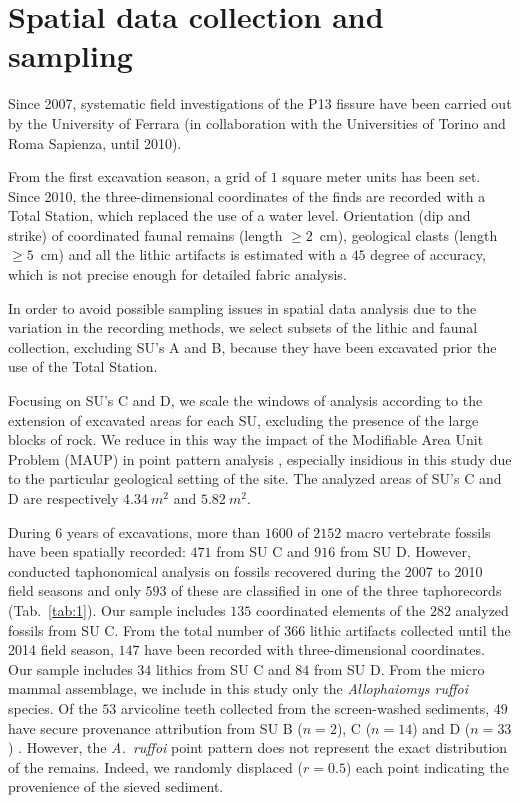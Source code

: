 \documentclass[review,authoryear]{elsarticle} %
\begin{document}
\section{Spatial data collection and sampling}

Since 2007, systematic field investigations of the P13 fissure have been carried out by the University of Ferrara (in collaboration with the Universities of Torino and Roma Sapienza, until 2010).

From the first excavation season, a grid of $1$ square meter units has been set. Since 2010, the three-dimensional coordinates of the finds are recorded with a Total Station, which replaced the use of a water level. Orientation (dip and strike) of coordinated faunal remains (length $\geq2$~cm), geological clasts (length $\geq5$~cm) and all the lithic artifacts is estimated with a $45$ degree of accuracy, which is not precise enough for detailed fabric analysis.

In order to avoid possible sampling issues in spatial data analysis due to the variation in the recording methods, we select subsets of the lithic and faunal collection, excluding SU's A and B, because they have been excavated prior the use of the Total Station.

Focusing on SU's C and D, we scale the windows of analysis according to the extension of excavated areas for each SU, excluding the presence of the large blocks of rock. We reduce in this way the impact of the Modifiable Area Unit Problem (MAUP) in point pattern analysis \citep{Openshaw1996}, especially insidious in this study due to the particular geological setting of the site. The analyzed areas of SU's C and D are respectively $4.34~m^{2}$ and $5.82~m^{2}$.

During 6 years of excavations, more than $1600$ of $2152$ macro vertebrate fossils have been spatially recorded: $471$ from SU C and $916$ from SU D. However, \citet{Bagnus2011} conducted taphonomical analysis on fossils recovered during the 2007 to 2010 field seasons and only $593$ of these are classified in one of the three taphorecords (Tab.~\ref{tab:1}). Our sample includes $135$ coordinated elements of the $282$ analyzed fossils from SU C. From the total number of $366$ lithic artifacts collected until the 2014 field season, $147$ have been recorded with three-dimensional coordinates. Our sample includes $34$ lithics from SU C and $84$ from SU D. From the micro mammal assemblage, we include in this study only the \emph{Allophaiomys ruffoi} species. Of the $53$ arvicoline teeth collected from the screen-washed sediments, $49$ have secure provenance attribution from SU B ($n=2$), C ($n=14$) and D ($n=33$) \citep{Lopez-Garcia2015}. However, the \emph{A.~ruffoi} point pattern does not represent the exact distribution of the remains. Indeed, we randomly displaced ($r=0.5$) each point indicating the provenience of the sieved sediment.
\end{document}
